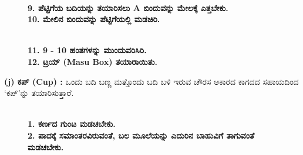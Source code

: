 \begin{figure}[H]
\\
\textbf{9. ಪೆಟ್ಟಿಗೆಯ ಬದಿಯನ್ನು ತಯಾರಿಸಲು A ಬಿಂದುವನ್ನು ಮೇಲಕ್ಕೆ ಎತ್ತಬೇಕು.}\\
\textbf{10. ಮೇಲಿನ ಬಿಂದುವನ್ನು ಪೆಟ್ಟಿಗೆಯಲ್ಲಿ ಮಡಚಿರಿ.}
\end{figure}
\begin{figure}[H]
\\
\textbf{11. 9 - 10 ಹಂತಗಳನ್ನು ಮುಂದುವರಿಸಿರಿ.}\\
\textbf{12. ಟ್ರಯ್ (Masu Box) ತಯಾರಾಯಿತು.}
\end{figure}

\noindent
\textbf{(j) ಕಪ್ (Cup) :} ಒಂದು ಬದಿ ಬಣ್ಣ ಮತ್ತೊಂದು ಬದಿ ಬಳಿ ಇರುವ ಚೌರಸ ಆಕಾರದ ಕಾಗದದ ಸಹಾಯದಿಂದ `ಕಪ್'ನ್ನು ತಯಾರಿಸುತ್ತಾರೆ.
\begin{figure}[H]
\\
\textbf{1. ಕರ್ಣದ ಗುಂಟ ಮಡಚಬೇಕು.}\\
\textbf{2. ಪಾದಕ್ಕೆ ಸಮಾಂತರವಿರುವಂತೆ, ಬಲ ಮೂಲೆಯನ್ನು ಎದುರಿನ ಬಾಹುವಿಗೆ ತಾಗುವಂತೆ ಮಡಚಬೇಕು.}
\end{figure}

